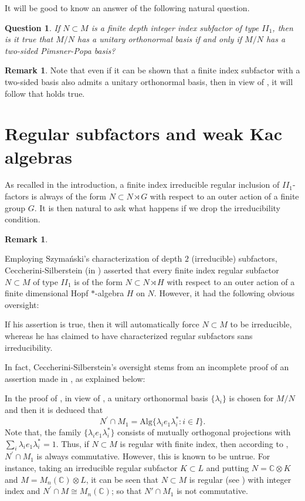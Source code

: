 \documentclass{amsart}
\newtheorem{question}[theorem]{Question}
\theoremstyle{definition}
\theoremstyle{theorem}
\newtheorem{remark}[theorem]{Remark}
\newcommand{\C}{\mathbb{C}}
\begin{document}
It will be good to know an answer of the following natural question.
 \begin{question}
  If $N\subset M$ is a finite depth integer index subfactor of type
  $II_1$, then is it true that $M/N$ has a unitary orthonormal basis if
  and only if $M/N$ has a two-sided Pimsner-Popa basis?
 \end{question}

 \begin{remark}
  Note that even if it can be shown that a finite index subfactor with a
  two-sided basis also admits a unitary orthonormal basis, then in
  view of \cite{BG}, it will follow that  holds
  true.
  \end{remark}


 
 
 \section{Regular subfactors and weak Kac algebras}
As recalled in the introduction, a finite index irreducible regular
inclusion of $II_1$-factors is always of the form $N \subset N \rtimes
G$ with respect to an outer action of a finite group $G$.  It is then
natural to ask what happens if we drop the irreducibility condition.

\begin{remark}\label{gap}

 Employing Szyma\'{n}ski's characterization of depth $2$ (irreducible)
 subfactors, Ceccherini-Silberstein (in \cite[Theorem 4.6]{S}) asserted that
 every finite index regular subfactor $N \subset M$ of type $II_1$ is
 of the form $N \subset N \rtimes H$ with respect to an outer action
 of a finite dimensional Hopf $*$-algebra $H$ on $N$. However, it had the
 following obvious oversight:\smallskip

 If his assertion  is true, then it will automatically force
 $N\subset M$ to be irreducible, whereas he has claimed to
 have characterized regular subfactors sans irreducibility.\medskip

In fact, Ceccherini-Silberstein's oversight stems from  an incomplete
  proof of an assertion made in \cite[Theorem 4.5]{S}, as explained
below:\smallskip

In the proof of \cite[Theorem 4.6]{S}, in view of \cite[Theorem
  4.5]{S}, a unitary orthonormal basis $\{\lambda_i\}$ is chosen
  for $M/N$ and then it is deduced that $$ N^{\prime}\cap
  M_1=\text{Alg}\{\lambda_ie_1\lambda^*_i:i\in I\}.
$$ Note that, the family $\{\lambda_ie_1\lambda^*_i\}$ consists of
  mutually orthogonal projections with $\sum_i
  \lambda_ie_1\lambda^*_i= 1$.  Thus, if $N\subset M$ is regular with
  finite index, then according to \cite[Theorem 4.6]{S},
  $N^{\prime}\cap M_1$ is always commutative. However, this is known to be
  untrue. For instance, taking an irreducible regular subfactor
  $K\subset L$ and putting $N=\C\otimes K$ and $M=M_n(\mathbb
  C)\otimes L$, it can be seen that $N\subset M$ is regular (see
  ) with integer index and $N^{\prime}\cap M \cong
  M_n(\mathbb C)$; so that $N'\cap M_1$ is not commutative.\smallskip
\end{remark}
\end{document}
